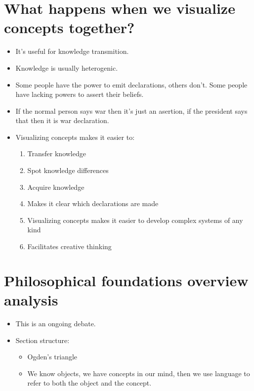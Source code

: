 \section{What happens when we visualize concepts together?}
\begin{itemize}
    \item It's useful for knowledge transmition.
    \item Knowledge is usually heterogenic.
    \item Some people have the power to emit declarations, others don't. Some people have lacking powers to assert their beliefs.
    \item If the normal person says war then it's just an asertion, if the president says that then it is war declaration.
    \item Visualizing concepts makes it easier to:
        \begin{enumerate}
            \item Transfer knowledge 
            \item Spot knowledge differences 
            \item Acquire knowledge 
            \item Makes it clear which declarations are made
            \item Visualizing concepts makes it easier to develop complex systems of any kind
            \item Facilitates creative thinking 
        \end{enumerate}
\end{itemize}



\section{Philosophical foundations overview analysis}
\begin{itemize}
    \item This is an ongoing debate. 
    \item Section structure:
        \begin{itemize}
            \item Ogden's triangle 
            \item We know objects, we have concepts in our mind, then we use language to refer to both the object and the concept.
        \end{itemize}
\end{itemize}


